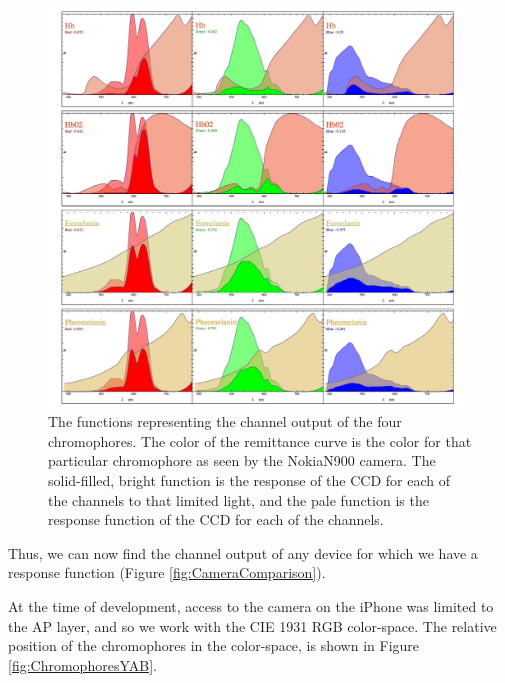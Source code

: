 \begin{figure}[h!]
  \centering
    \includegraphics[width=0.99\textwidth]{Chapter1/Figs/Chromophores_NokiaN900.jpg}
    \caption{The functions representing the channel output of the four chromophores. The color of the remittance curve is the color for that particular chromophore as seen by the NokiaN900 camera. The solid-filled, bright function is the response of the CCD for each of the channels to that limited light, and the pale function is the response function of the CCD for each of the channels.}  \label{fig:Chromophores_NokiaN900}
\end{figure}



Thus, we can now find the channel output of any device for which we have a response function (Figure \ref{fig:CameraComparison}).

At the time of development, access to the camera on the iPhone was limited to the AP layer, and so we work with the CIE 1931 RGB color-space. The relative position of the chromophores in the color-space, is shown in Figure \ref{fig:ChromophoresYAB}.








